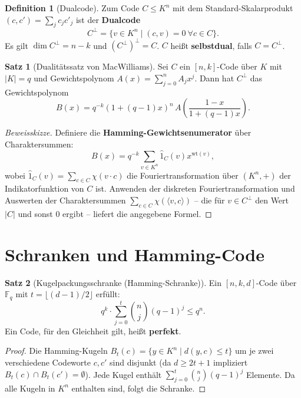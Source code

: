 ﻿\documentclass[a4paper,12pt]{report}
\theoremstyle{definition}
\newtheorem{definition}{Definition}
\newtheorem{satz}{Satz}
\begin{document}
\begin{definition}[Dualcode]
    Zum Code $C \leq K^n$ mit dem Standard-Skalarprodukt $(c, c') =
    \sum_j c_j c'_j$ ist der \textbf{Dualcode}
    \[
        C^\perp = \{v \in K^n \mid (c, v) = 0\ \forall c \in C\}.
    \]
    Es gilt $\dim C^\perp = n - k$ und $(C^\perp)^\perp = C$.
    $C$ heißt \textbf{selbstdual}, falls $C = C^\perp$.
\end{definition}

\begin{satz}[Dualitätssatz von MacWilliams]
    Sei $C$ ein $[n, k]$-Code über $K$ mit $|K| = q$ und
    Gewichtspolynom $A(x) = \sum_{j=0}^n A_j x^j$. Dann hat
    $C^\perp$ das Gewichtspolynom
    \[
        B(x) = q^{-k}(1 + (q-1)x)^n\, A\!\left(\frac{1-x}{1+(q-1)x}\right).
    \]
\end{satz}
\begin{proof}[Beweisskizze]
    Definiere die \textbf{Hamming-Gewichtsenumerator} über Charaktersummen:
    \[
        B(x) = q^{-k} \sum_{v \in K^n} \hat{1}_C(v) x^{\mathrm{wt}(v)},
    \]
    wobei $\hat{1}_C(v) = \sum_{c \in C} \chi(v \cdot c)$ die Fouriertransformation
    über $(K^n, +)$ der Indikatorfunktion von $C$ ist. Anwenden der diskreten
    Fouriertransformation und Auswerten der Charaktersummen
    $\sum_{c \in C} \chi(\langle v, c \rangle)$ -- die für $v \in C^\perp$
    den Wert $|C|$ und sonst $0$ ergibt -- liefert die angegebene Formel.
\end{proof}

\section{Schranken und Hamming-Code}

\begin{satz}[Kugelpackungsschranke (Hamming-Schranke)]
    Ein $[n, k, d]$-Code über $\mathbb{F}_q$ mit $t = \lfloor(d-1)/2\rfloor$
    erfüllt:
    \[
        q^k \cdot \sum_{j=0}^t \binom{n}{j}(q-1)^j \leq q^n.
    \]
    Ein Code, für den Gleichheit gilt, heißt \textbf{perfekt}.
\end{satz}
\begin{proof}
    Die Hamming-Kugeln $B_t(c) = \{y \in K^n \mid d(y,c) \leq t\}$
    um je zwei verschiedene Codeworte $c, c'$ sind disjunkt (da $d \geq 2t+1$
    impliziert $B_t(c) \cap B_t(c') = \emptyset$). Jede Kugel enthält
    $\sum_{j=0}^t \binom{n}{j}(q-1)^j$ Elemente.
    Da alle Kugeln in $K^n$ enthalten sind, folgt die Schranke.
\end{proof}
\end{document}
